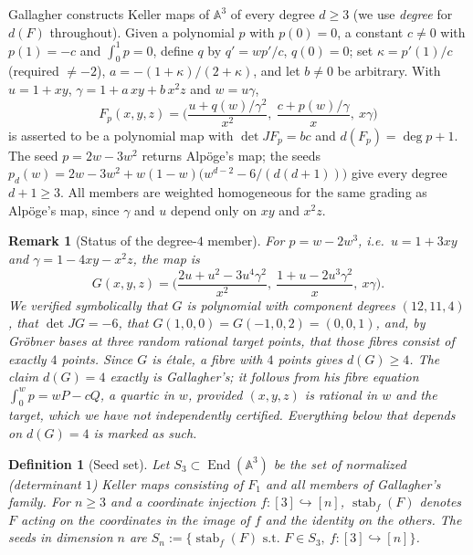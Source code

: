 \documentclass[11pt]{article}
\theoremstyle{change}
\newtheorem{definition}[equation]{Definition}
\newtheorem{remark}[equation]{Remark}
\theoremstyle{nonumberplain}
\renewcommand\AA{{\mathbb A}}
\newcommand\mono{\hookrightarrow}
\newcommand\st{{\textrm{ s.t.\ }}}
\newcommand\setof[1]{\{ #1 \}}
\DeclareMathOperator{\End}{End}
\DeclareMathOperator{\stab}{stab}
\begin{document}
Gallagher \cite{fam} constructs Keller maps of $\AA^3$ of every degree $d \geq 3$ (we use \emph{degree} for $d(F)$ throughout). Given a polynomial $p$ with $p(0) = 0$, a constant $c \neq 0$ with $p(1) = -c$ and $\int_0^1 p = 0$, define $q$ by $q' = w p'/c$, $q(0) = 0$; set $\kappa = p'(1)/c$ (required $\neq -2$), $a = -(1+\kappa)/(2+\kappa)$, and let $b \neq 0$ be arbitrary. With $u = 1+xy$, $\gamma = 1 + a\,xy + b\,x^2 z$ and $w = u\gamma$,
\begin{equation*}
F_p(x,y,z) = \Big( \frac{u + q(w)/\gamma^2}{x^2},\ \frac{c + p(w)/\gamma}{x},\ x\gamma \Big)
\end{equation*}
is asserted to be a polynomial map with $\det JF_p = bc$ and $d(F_p) = \deg p + 1$. The seed $p = 2w - 3w^2$ returns Alp\"oge's map; the seeds $p_d(w) = 2w - 3w^2 + w(1-w)\big(w^{d-2} - 6/(d(d+1))\big)$ give every degree $d+1 \geq 3$. All members are weighted homogeneous for the same grading as Alp\"oge's map, since $\gamma$ and $u$ depend only on $xy$ and $x^2z$.

\begin{remark}[Status of the degree-$4$ member\label{deg4}]
For $p = w - 2w^3$, i.e.\ $u = 1+3xy$ and $\gamma = 1 - 4xy - x^2 z$, the map is
\begin{equation*}
G(x,y,z) = \Big( \frac{2u + u^2 - 3u^4\gamma^2}{x^2},\ \frac{1 + u - 2u^3\gamma^2}{x},\ x\gamma \Big).
\end{equation*}
We verified symbolically that $G$ is polynomial with component degrees $(12, 11, 4)$, that $\det JG = -6$, that $G(1,0,0) = G(-1,0,2) = (0,0,1)$, and, by Gr\"obner bases at three random rational target points, that those fibres consist of exactly $4$ points. Since $G$ is \'etale, a fibre with $4$ points gives $d(G) \geq 4$. The claim $d(G) = 4$ exactly is Gallagher's; it follows from his fibre equation $\int_0^w p = wP - cQ$, a quartic in $w$, provided $(x,y,z)$ is rational in $w$ and the target, which we have not independently certified. Everything below that depends on $d(G) = 4$ is marked as such.
\end{remark}

\begin{definition}[Seed set]
Let $S_3 \subset \End(\AA^3)$ be the set of normalized (determinant $1$) Keller maps consisting of $F_1$ and all members of Gallagher's family. For $n \geq 3$ and a coordinate injection $f : [3] \mono [n]$, $\stab_f(F)$ denotes $F$ acting on the coordinates in the image of $f$ and the identity on the others. The \emph{seeds in dimension $n$} are $S_n := \setof{ \stab_f(F) \st F \in S_3,\ f : [3] \mono [n] }$.
\end{definition}
\end{document}
